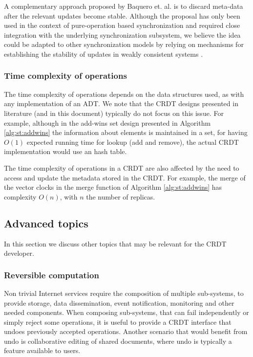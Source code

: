\documentclass[11pt,a4paper]{article}
\begin{document}
A complementary approach proposed by Baquero et. al. \cite{Baquero14Making} 
is to discard meta-data after the relevant updates become stable.
Although the proposal has only been used in the context of pure-operation based 
synchronization and required close integration with the underlying synchronization
subsystem, we believe the idea could be adapted to other synchronization models
by relying on mechanisms
for establishing the stability of updates in weakly consistent systems \cite{Golding92Weak}.


\subsubsection{Time complexity of operations}
The time complexity of operations depends on the data structures used, as
with any implementation of an ADT. We note that the CRDT designs presented in
literature (and in this document) typically do not focus on this issue.
For example, although in the add-wins set design presented in 
Algorithm \ref{alg:st:addwins} the information about elements is maintained in a set, 
for having $O(1)$ expected running time for lookup (add and remove), the actual CRDT 
implementation would use an hash table.

The time complexity of operations in a CRDT are also affected by the need to access and
update the metadata stored in the CRDT.
For example, the merge of the vector clocks in the merge function of 
Algorithm \ref{alg:st:addwins} has complexity $O(n)$, with $n$ the number of 
replicas.

\subsection{Advanced topics}

In this section we discuss other topics that may be relevant for the CRDT developer.

\subsubsection{Reversible computation}
Non trivial Internet services require the composition of multiple sub-systems, 
to provide storage, data dissemination, event notification, monitoring and 
other needed components. 
When composing sub-systems, that can fail independently or simply reject some 
operations, it is useful to provide a CRDT interface that undoes 
previously accepted operations. 
Another scenario that would benefit from undo is collaborative editing of 
shared documents, where undo is typically a feature available to users.
\end{document}

